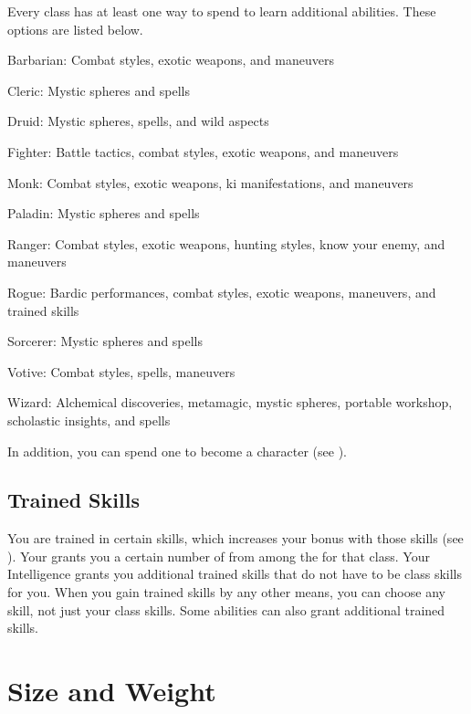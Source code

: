     Every class has at least one way to spend  to learn additional abilities.
    These options are listed below.
    \begin{raggeditemize}
      \item Barbarian: Combat styles, exotic weapons, and maneuvers
      \item Cleric: Mystic spheres and spells
      \item Druid: Mystic spheres, spells, and wild aspects
      \item Fighter: Battle tactics, combat styles, exotic weapons, and maneuvers
      \item Monk: Combat styles, exotic weapons, ki manifestations, and maneuvers
      \item Paladin: Mystic spheres and spells
      \item Ranger: Combat styles, exotic weapons, hunting styles, know your enemy, and maneuvers
      \item Rogue: Bardic performances, combat styles, exotic weapons, maneuvers, and trained skills
      \item Sorcerer: Mystic spheres and spells
      \item Votive: Combat styles, spells, maneuvers
      \item Wizard: Alchemical discoveries, metamagic, mystic spheres, portable workshop, scholastic insights, and spells
    \end{raggeditemize}

    In addition, you can spend one  to become a  character (see ).

  \subsection{Trained Skills}\label{Trained Skills}
    You are trained in certain skills, which increases your bonus with those skills (see ).
    Your  grants you a certain number of  from among the  for that class.
    Your Intelligence grants you additional trained skills that do not have to be class skills for you.
    When you gain trained skills by any other means, you can choose any skill, not just your class skills.
    Some abilities can also grant additional trained skills.

\section{Size and Weight}\label{Size and Weight}


